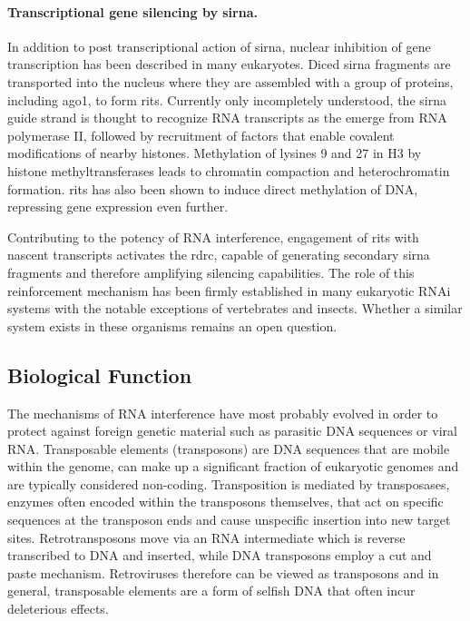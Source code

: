 \paragraph{Transcriptional gene silencing by \gls{sirna}.}
In addition to post transcriptional action of \gls{sirna}, nuclear inhibition of gene transcription has been described in many eukaryotes. Diced \gls{sirna} fragments are transported into the nucleus where they are assembled with a group of proteins, including \gls{ago}1, to form \gls{rits}. Currently only incompletely understood, the \gls{sirna} guide strand is thought to recognize RNA transcripts as the emerge from RNA polymerase II, followed by recruitment of factors that enable covalent modifications of nearby histones. Methylation of lysines 9 and 27 in H3 by histone methyltransferases leads to chromatin compaction and heterochromatin formation. \Gls{rits} has also been shown to induce direct methylation of DNA, repressing gene expression even further.

Contributing to the potency of RNA interference, engagement of \gls{rits} with nascent transcripts activates the \gls{rdrc}, capable of generating secondary \gls{sirna} fragments and therefore amplifying silencing capabilities. The role of this reinforcement mechanism has been firmly established in many eukaryotic RNAi systems with the notable exceptions of vertebrates and insects. Whether a similar system exists in these organisms remains an open question.

\subsection{Biological Function}
The mechanisms of RNA interference have most probably evolved in order to protect against foreign genetic material such as parasitic DNA sequences or viral RNA. Transposable elements (transposons) are DNA sequences that are mobile within the genome, can make up a significant fraction of eukaryotic genomes and are typically considered non-coding. Transposition is mediated by transposases, enzymes often encoded within the transposons themselves, that act on specific sequences at the transposon ends and cause unspecific insertion into new target sites. Retrotransposons move via an RNA intermediate which is reverse transcribed to DNA and inserted, while DNA transposons employ a cut and paste mechanism. Retroviruses therefore can be viewed as transposons and in general, transposable elements are a form of selfish DNA that often incur deleterious effects.

